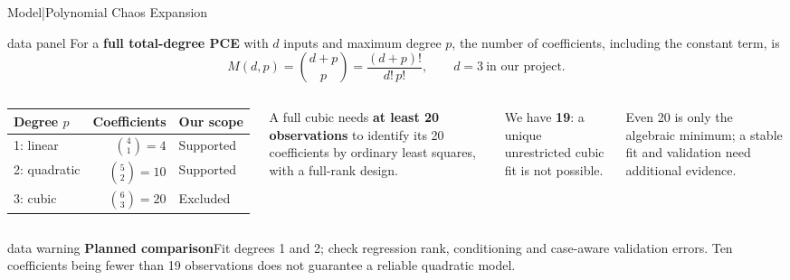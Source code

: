 \begin{frame}{Model\enspace|\enspace Polynomial Chaos Expansion}
  \begin{beamercolorbox}[sep=2mm,wd=\textwidth]{data panel}
    \footnotesize
    For a \textbf{full total-degree PCE} with $d$ inputs and maximum degree $p$,
    the number of coefficients, including the constant term, is
    \[
      M(d,p)=\binom{d+p}{p}=\frac{(d+p)!}{d!\,p!},
      \qquad d=3\ \text{in our project}.
    \]
  \end{beamercolorbox}
  \medskip
  \begin{columns}[T,onlytextwidth]
      {\footnotesize
      \renewcommand{\arraystretch}{1.3}
      \begin{tabular*}{\linewidth}{@{\extracolsep{\fill}}lrl@{}}
        \toprule
        \textbf{Degree $p$} & \textbf{Coefficients} & \textbf{Our scope}\\
        \midrule
        1: linear & $\binom{4}{1}=4$ & Supported\\
        2: quadratic & $\binom{5}{2}=10$ & Supported\\
        3: cubic & $\binom{6}{3}=20$ & Excluded\\
        \bottomrule
      \end{tabular*}
      }

      \footnotesize
      A full cubic needs \textbf{at least 20 observations} to identify its
      20 coefficients by ordinary least squares, with a full-rank design.\par
      \smallskip
      We have \textbf{19}: a unique unrestricted cubic fit is not possible.\par
      \smallskip
      Even 20 is only the algebraic minimum; a stable fit and validation need
      additional evidence.
  \end{columns}
  \medskip
  \begin{beamercolorbox}[sep=1.5mm,wd=\textwidth]{data warning}
    \footnotesize
    \textbf{Planned comparison}\quad Fit degrees 1 and 2; check regression rank,
    conditioning and case-aware validation errors. Ten coefficients being fewer
    than 19 observations does not guarantee a reliable quadratic model.
  \end{beamercolorbox}
\end{frame}

